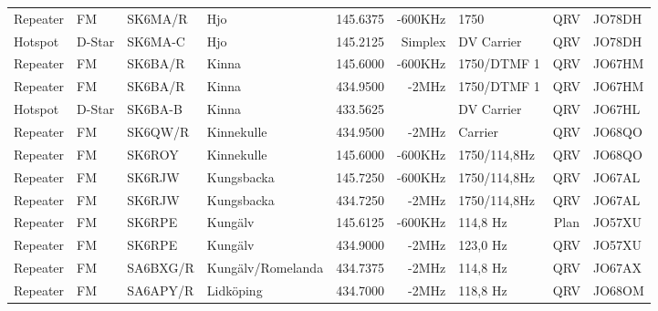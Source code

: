 \begin{landscape}
\begin{longtable}{llllrrlcl}
	Repeater          & FM           & SK6MA/R       & Hjo                 &          145.6375 &        -600KHz & 1750            &       QRV       & JO78DH           \\
	Hotspot           & D-Star       & SK6MA-C       & Hjo                 &          145.2125 &        Simplex & DV Carrier      &       QRV       & JO78DH           \\
	Repeater          & FM           & SK6BA/R       & Kinna               &          145.6000 &        -600KHz & 1750/DTMF 1     &       QRV       & JO67HM           \\
	Repeater          & FM           & SK6BA/R       & Kinna               &          434.9500 &          -2MHz & 1750/DTMF 1     &       QRV       & JO67HM           \\
	Hotspot           & D-Star       & SK6BA-B       & Kinna               &          433.5625 &                & DV Carrier      &       QRV       & JO67HL           \\
	Repeater          & FM           & SK6QW/R       & Kinnekulle          &          434.9500 &          -2MHz & Carrier         &       QRV       & JO68QO           \\
	Repeater          & FM           & SK6ROY        & Kinnekulle          &          145.6000 &        -600KHz & 1750/114,8Hz    &       QRV       & JO68QO           \\
	Repeater          & FM           & SK6RJW        & Kungsbacka          &          145.7250 &        -600KHz & 1750/114,8Hz    &       QRV       & JO67AL           \\
	Repeater          & FM           & SK6RJW        & Kungsbacka          &          434.7250 &          -2MHz & 1750/114,8Hz    &       QRV       & JO67AL           \\
	Repeater          & FM           & SK6RPE        & Kungälv             &          145.6125 &        -600KHz & 114,8 Hz        &      Plan       & JO57XU           \\
	Repeater          & FM           & SK6RPE        & Kungälv             &          434.9000 &          -2MHz & 123,0 Hz        &       QRV       & JO57XU           \\
	Repeater          & FM           & SA6BXG/R      & Kungälv/Romelanda   &          434.7375 &          -2MHz & 114,8 Hz        &       QRV       & JO67AX           \\
	Repeater          & FM           & SA6APY/R      & Lidköping           &          434.7000 &          -2MHz & 118,8 Hz        &       QRV       & JO68OM           \\

\end{longtable}
\end{landscape}
